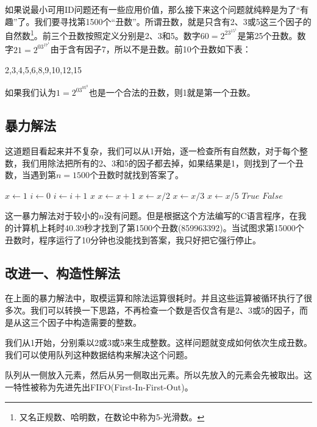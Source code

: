 \documentclass[UTF8]{article}
\begin{document}
如果说最小可用ID问题还有一些应用价值，那么接下来这个问题就纯粹是为了“有趣”了。我们要寻找第1500个“丑数”。所谓丑数，就是只含有2、3或5这三个因子的自然数\footnote{又名正规数、哈明数，在数论中称为5-光滑数。}。前三个丑数按照定义分别是2、3和5。数字$60 = 2^23^15^1$是第25个丑数。数字$21 = 2^03^17^1$由于含有因子7，所以不是丑数。前10个丑数如下表：

2,3,4,5,6,8,9,10,12,15

如果我们认为$1=2^03^05^0$也是一个合法的丑数，则1就是第一个丑数。

\subsection{暴力解法}

这道题目看起来并不复杂，我们可以从1开始，逐一检查所有自然数，对于每个整数，我们用除法把所有的2、3和5的因子都去掉，如果结果是1，则找到了一个丑数，当遇到第$n=1500$个丑数时就找到答案了。

\begin{algorithmic}[1]
  \State $x \gets 1$
  \State $i \gets 0$
  \Loop
      \State $i \gets i + 1$
        \State \Return $x$
      \EndIf
    \EndIf
    \State $x \gets x + 1$
  \EndLoop
\EndFunction
\Statex
{}
    \State $x \gets x / 2$
  \EndWhile
    \State $x \gets x / 3$
  \EndWhile
    \State $x \gets x / 5$
  \EndWhile
    \State \Return $True$
  \Else
    \State \Return $False$
  \EndIf
\EndFunction
\end{algorithmic}

这一暴力解法对于较小的$n$没有问题。但是根据这个方法编写的C语言程序，在我的计算机上耗时40.39秒才找到了第1500个丑数(859963392)。当试图求第15000个丑数时，程序运行了10分钟也没能找到答案，我只好把它强行停止。

\subsection{改进一、构造性解法}
在上面的暴力解法中，取模运算和除法运算很耗时\cite{Bentley}。并且这些运算被循环执行了很多次。我们可以转换一下思路，不再检查一个数是否仅含有是2、3或5的因子，而是从这三个因子中构造需要的整数。

我们从1开始，分别乘以2或3或5来生成整数。这样问题就变成如何依次生成丑数。我们可以使用队列这种数据结构来解决这个问题。

队列从一侧放入元素，然后从另一侧取出元素。所以先放入的元素会先被取出。这一特性被称为先进先出FIFO(First-In-First-Out)。
\end{document}
